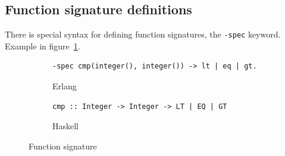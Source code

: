 \documentclass[english,11pt]{l4proj}
\begin{document}
\begin{appendices}
\subsection{Function signature definitions}

There is special syntax for defining function signatures, the {\tt -spec}
keyword. Example in figure~\ref{fig:spec}.

\begin{figure}
    \begin{subfigure}[b]{\textwidth}
        \begin{verbatim}
-spec cmp(integer(), integer()) -> lt | eq | gt.
        \end{verbatim}
        \caption{Erlang}
    \end{subfigure}

    \begin{subfigure}[b]{\textwidth}
        \begin{verbatim}
cmp :: Integer -> Integer -> LT | EQ | GT
        \end{verbatim}
        \caption{Haskell}
    \end{subfigure}
    \caption{Function signature}
    \label{fig:spec}
\end{figure}

\end{appendices}

\clearpage

\educationalconsent
\end{document}

